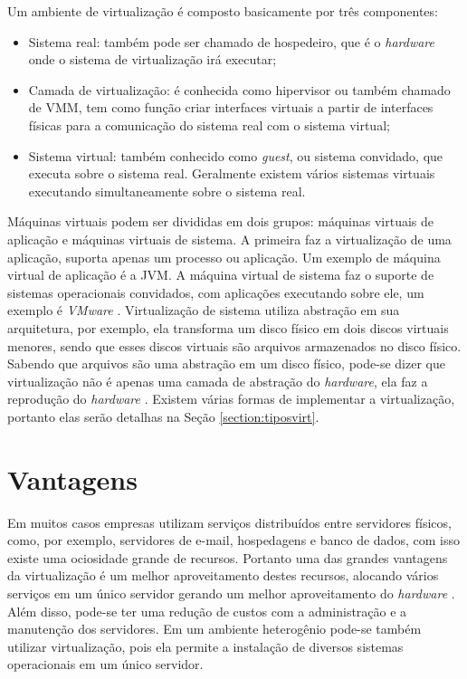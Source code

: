 Um ambiente de virtualização é composto basicamente por três componentes:
\begin{itemize}
 \item Sistema real: também pode ser chamado de hospedeiro, que é o \textit{hardware} onde o sistema de virtualização irá executar;
 \item Camada de virtualização: é conhecida como hipervisor ou também chamado de \ac{VMM}, tem como função criar interfaces virtuais a
 partir de interfaces físicas para a comunicação do sistema real com o sistema virtual;
 \item Sistema virtual: também conhecido como \textit{guest}, ou sistema convidado, que executa sobre o sistema real. Geralmente
 existem vários sistemas virtuais executando simultaneamente sobre o sistema real.
\end{itemize}

Máquinas virtuais podem ser divididas em dois grupos: máquinas virtuais de aplicação e máquinas virtuais de sistema. A primeira faz a
virtualização de uma aplicação, suporta apenas um processo ou aplicação. Um exemplo de máquina virtual de aplicação é a \ac{JVM}. 
A máquina virtual de sistema faz o suporte de sistemas operacionais convidados, com aplicações executando sobre ele, um exemplo é 
\textit{VMware} \cite{laureano2008}.
Virtualização de sistema utiliza abstração em sua arquitetura, por exemplo, ela transforma um disco físico em dois discos 
virtuais menores, sendo que esses discos virtuais são arquivos armazenados no disco físico. Sabendo que arquivos são uma abstração
em um disco físico, pode-se dizer que virtualização não é apenas uma camada de abstração do \textit{hardware}, ela faz a reprodução 
do \textit{hardware} \cite{smithenair2005}.
Existem várias formas de implementar a virtualização, portanto elas serão detalhas na Seção \ref{section:tiposvirt}.

\section{Vantagens}
\label{section:vantagensvirt}

Em muitos casos empresas utilizam serviços distribuídos entre servidores físicos, como, por exemplo, servidores de e-mail, hospedagens e 
banco de dados, com isso existe uma ociosidade grande de recursos. Portanto uma das grandes vantagens da virtualização é um melhor 
aproveitamento destes recursos, alocando vários serviços em um único servidor gerando um melhor aproveitamento do \textit{hardware} 
\cite{moreira2006}. Além disso, pode-se ter uma redução de custos com a administração e a manutenção dos servidores. Em um ambiente 
heterogênio pode-se também utilizar virtualização, pois ela permite a instalação de diversos sistemas operacionais em um único servidor.

